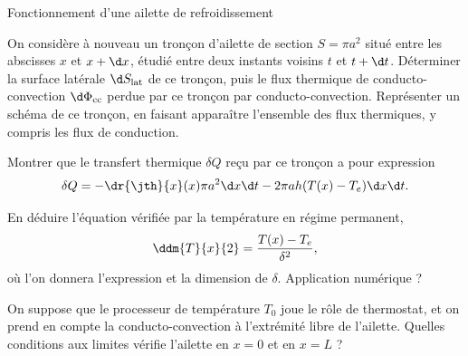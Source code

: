 \begin{exo}[PC][1][devoir]{Fonctionnement d'une ailette de refroidissement}
\begin{quest}
\item On considère à nouveau un tronçon d'ailette de section $S=\pi a^2$ situé entre les abscisses $x$ et $x + \d x$, étudié entre deux instants voisins $t$ et $t + \d t$.
Déterminer la surface latérale $\d S_{\rm lat}$ de ce tronçon, puis le flux thermique de conducto-convection $\d \Phi_{\rm cc}$ perdue par ce tronçon par conducto-convection.
Représenter un schéma de ce tronçon, en faisant apparaître l'ensemble des flux thermiques, y compris les flux de conduction.
\item Montrer que le transfert thermique $\delta Q$ reçu par ce tronçon a pour expression
$$
\delta Q = - \dr{\jth}{x}(x) \pi a^2 \d x \d t - 2\pi a h  (T(x)-T_e) \d x \d t.
$$
\item En déduire l'équation vérifiée par la température en régime permanent,
\begin{equation}\label{eq:T}
   \ddm{T}{x}{2}  = \frac{T(x)-T_e}{\delta^2},
\end{equation}
où l'on donnera l'expression et la dimension de $\delta$. Application numérique ?
\item
On suppose que le processeur de température $T_0$ joue le rôle de thermostat, et on prend en compte la conducto-convection à l'extrémité libre de l'ailette.
 Quelles conditions aux limites vérifie l'ailette en $x=0$ et en $x=L$ ?
\end{quest}
\end{exo}
